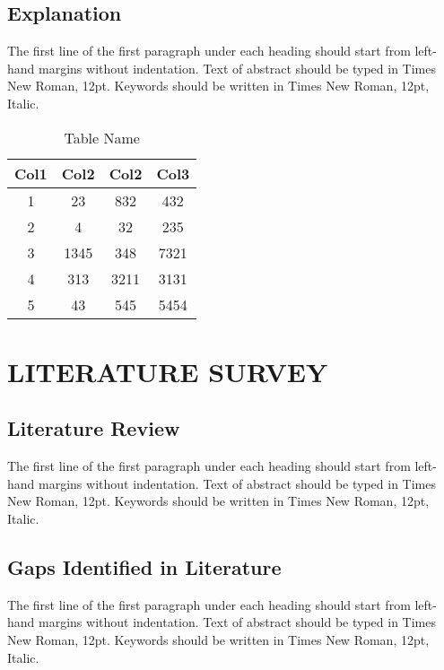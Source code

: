 \documentclass[a4paper, 12pt]{report}
\begin{document}
\section{Explanation}
\par The first line of the first paragraph under each heading should start from left-hand margins without indentation.  Text of abstract should be typed in Times New Roman, 12pt. Keywords should be written in Times New Roman, 12pt, Italic.\\
\begin{table}[h]

\begin{center}
 \begin{tabular}{||c|c|c|c||} 

 \hline
 Col1 & Col2 & Col2 & Col3 \\ [0.5ex] 
 \hline\hline
 1 & 23 & 832 & 432 \\ 
 \hline
 2 & 4 & 32 & 235 \\
 \hline
 3 & 1345 & 348 & 7321 \\
 \hline
 4 & 313 & 3211 & 3131 \\
 \hline
 5 & 43 & 545 & 5454 \\ [1ex] 
 \hline
\end{tabular}\caption{Table Name}
\end{center}


\end{table}

\chapter{LITERATURE SURVEY }
\section{Literature Review}
\par The first line of the first paragraph under each heading should start from left-hand margins without indentation.  Text of abstract should be typed in Times New Roman, 12pt. Keywords should be written in Times New Roman, 12pt, Italic.\\

\section{Gaps Identified in Literature}
\par The first line of the first paragraph under each heading should start from left-hand margins without indentation.  Text of abstract should be typed in Times New Roman, 12pt. Keywords should be written in Times New Roman, 12pt, Italic.\\
\end{document}
